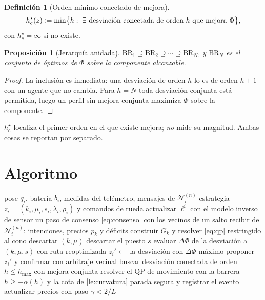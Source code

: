 \documentclass[11pt,a4paper]{article}
\theoremstyle{plain}
\newtheorem{proposicion}[teorema]{Proposición}
\theoremstyle{definition}
\newtheorem{definicion}[teorema]{Definición}
\theoremstyle{remark}
\newcommand{\Ncal}{\mathcal{N}}
\newcommand{\T}{^{\!\top}}
\newcommand{\defeq}{\vcentcolon=}
\begin{document}
\begin{definicion}[Orden mínimo conectado de mejora]
\[
  h_c^{\star}(z)\defeq\min\bigl\{h:\ \exists\ \text{desviación conectada de
  orden }h\text{ que mejora }\Phi\bigr\},
\]
con $h_c^\star=\infty$ si no existe.
\end{definicion}

\begin{proposicion}[Jerarquía anidada]
\label{pr:jerarquia}
$\mathrm{BR}_1\supseteq\mathrm{BR}_2\supseteq\cdots\supseteq\mathrm{BR}_N$, y
$\mathrm{BR}_N$ es el conjunto de óptimos de $\Phi$ sobre la componente
alcanzable.
\end{proposicion}

\begin{proof}
La inclusión es inmediata: una desviación de orden $h$ lo es de orden $h+1$
con un agente que no cambia. Para $h=N$ toda desviación conjunta está
permitida, luego un perfil sin mejora conjunta maximiza $\Phi$ sobre la
componente.
\end{proof}

$h_c^\star$ localiza el primer orden en el que existe mejora; \emph{no} mide su
magnitud. Ambas cosas se reportan por separado.


\section{Algoritmo}

\begin{algorithm}[!ht]
\caption{Megajuego distribuido de $n$ saltos, ejecutado por el AMR $i$}
\label{alg:megajuego}
\begin{algorithmic}[1]
\Require pose $q_i$, batería $b_i$, medidas del telémetro, mensajes de
         $\Ncal_i^{(n)}$
\Ensure estrategia $z_i=(k_i,\mu_i,s_i,\lambda_i,\rho_i)$ y comandos de rueda
\State actualizar $\ell^{i}$ con el modelo inverso de sensor
\State un paso de consenso \eqref{eq:consenso} con los vecinos de un salto
\State recibir de $\Ncal_i^{(n)}$: intenciones, precios $p_k$ y déficits
  \State construir $G_k$ y resolver \eqref{eq:qp} restringido al cono
   descartar $(k,\mu)$
  \EndIf
  \If{$e_i\T n_{ks}<\cos\beta$} descartar el puesto $s$
  \EndIf
  \State evaluar $\Delta\Phi$ de la desviación a $(k,\mu,s)$ con ruta
         reoptimizada
\EndFor
\State $z_i'\gets$ la desviación con $\Delta\Phi$ máximo
 proponer $z_i'$ y confirmar con arbitraje vecinal
\Else
  \State buscar desviación conectada de orden $h\le h_{\max}$ con mejora
         conjunta 
\EndIf
\State resolver el QP de movimiento con la barrera $\dot h\ge-\alpha(h)$ y la
       cota de \cref{le:curvatura}
 parada segura y registrar el evento
\EndIf
\State actualizar precios con paso $\gamma<2/L$ 
\end{algorithmic}
\end{algorithm}
\end{document}
